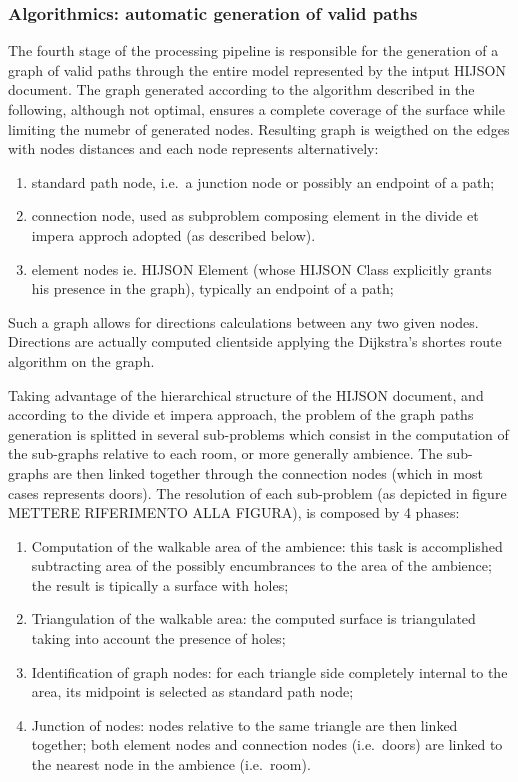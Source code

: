 \documentclass[]{article}
\begin{document}
\subsubsection{Algorithmics: automatic generation of valid
paths}\label{algorithmics-automatic-generation-of-valid-paths}

The fourth stage of the processing pipeline is responsible for the
generation of a graph of valid paths through the entire model
represented by the intput HIJSON document. The graph generated according
to the algorithm described in the following, although not optimal,
ensures a complete coverage of the surface while limiting the numebr of
generated nodes. Resulting graph is weigthed on the edges with nodes
distances and each node represents alternatively:

\begin{enumerate}
\def\labelenumi{\alph{enumi}.}
\itemsep1pt\parskip0pt
\item
  standard path node, i.e.~a junction node or possibly an endpoint of a
  path;
\item
  connection node, used as subproblem composing element in the divide et
  impera approch adopted (as described below).
\item
  element nodes ie. HIJSON Element (whose HIJSON Class explicitly grants
  his presence in the graph), typically an endpoint of a path;
\end{enumerate}

Such a graph allows for directions calculations between any two given
nodes. Directions are actually computed clientside applying the
Dijkstra's shortes route algorithm on the graph.

Taking advantage of the hierarchical structure of the HIJSON document,
and according to the divide et impera approach, the problem of the graph
paths generation is splitted in several sub-problems which consist in
the computation of the sub-graphs relative to each room, or more
generally ambience. The sub-graphs are then linked together through the
connection nodes (which in most cases represents doors). The resolution
of each sub-problem (as depicted in figure METTERE RIFERIMENTO ALLA
FIGURA), is composed by 4 phases:

\begin{enumerate}
\def\labelenumi{\arabic{enumi}.}
\itemsep1pt\parskip0pt
\item
  Computation of the walkable area of the ambience: this task is
  accomplished subtracting area of the possibly encumbrances to the area
  of the ambience; the result is tipically a surface with holes;
\item
  Triangulation of the walkable area: the computed surface is
  triangulated taking into account the presence of holes;
\item
  Identification of graph nodes: for each triangle side completely
  internal to the area, its midpoint is selected as standard path node;
\item
  Junction of nodes: nodes relative to the same triangle are then linked
  together; both element nodes and connection nodes (i.e.~doors) are
  linked to the nearest node in the ambience (i.e.~room).
\end{enumerate}
\end{document}
